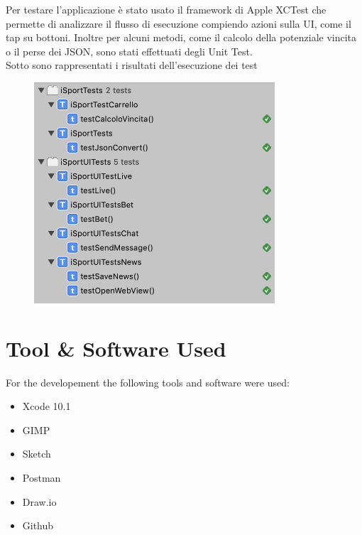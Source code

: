 \documentclass[numbers=noenddot, 12pt, a4paper, oneside]{scrbook}
\begin{document}
Per testare l'applicazione è stato usato il framework di Apple XCTest che permette di analizzare il flusso di esecuzione compiendo azioni sulla UI, come il tap su bottoni. Inoltre per alcuni metodi, come il calcolo della potenziale vincita o il perse dei JSON, sono stati effettuati degli Unit Test.\\

Sotto sono rappresentati i risultati dell'esecuzione dei test
\begin{figure}[H]
	\centering
	\includegraphics[width=0.8\textwidth]{images/TestUnit}
\end{figure}
\chapter{Tool \& Software Used}
For the developement the following tools and software were used:
\begin{itemize}
	\item Xcode 10.1
	\item GIMP
	\item Sketch
	\item Postman
	\item Draw.io
	\item Github
\end{itemize}
\end{document}
